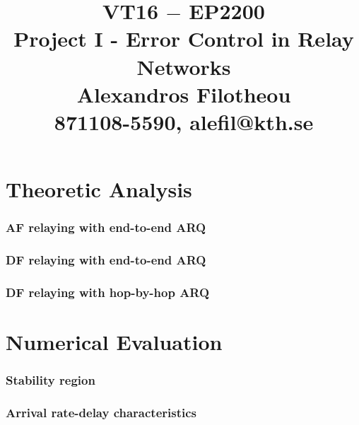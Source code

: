 \documentclass[a4paper,12pt,oneside,onecolumn]{article} %
\title{VT16 $-$ EP2200 \\
  Project I - Error Control in Relay Networks \\
  Alexandros Filotheou \\
  871108-5590, alefil@kth.se }
\date{}
\begin{document}
	\maketitle

  \part*{Theoretic Analysis}

    \section{AF relaying with end-to-end ARQ}
    

    \section{DF relaying with end-to-end ARQ}
    

    \section{DF relaying with hop-by-hop ARQ}
    


  \newpage
  \part*{Numerical Evaluation}

    \section{Stability region}
    

    \section*{Arrival rate-delay characteristics}
    
\end{document}
